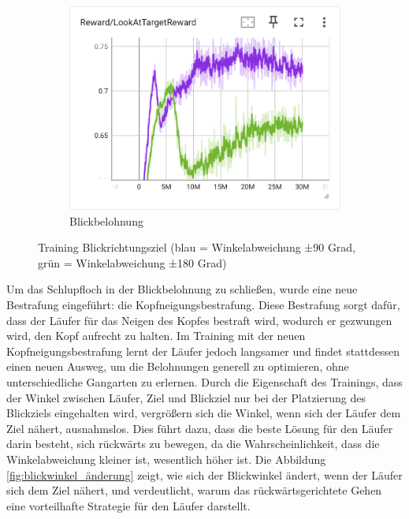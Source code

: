 \begin{figure}[H]
\begin{subfigure}{.49\textwidth}
      \centering  
      \includegraphics[width=\textwidth]{img/104_105_look_reward}
      \caption{Blickbelohnung}
      \label{fig:104_105_look_reward}
    \end{subfigure}
  \caption{Training Blickrichtungsziel (blau = Winkelabweichung ±90 Grad, grün = Winkelabweichung ±180 Grad)}
  \label{fig:training_blickrichtungsziel}
\end{figure}

Um das Schlupfloch in der Blickbelohnung zu schließen, wurde eine neue Bestrafung eingeführt: die Kopfneigungsbestrafung. Diese Bestrafung sorgt dafür, dass der Läufer für das Neigen des Kopfes bestraft wird, wodurch er gezwungen wird, den Kopf aufrecht zu halten. Im Training mit der neuen Kopfneigungsbestrafung lernt der Läufer jedoch langsamer und findet stattdessen einen neuen Ausweg, um die Belohnungen generell zu optimieren, ohne unterschiedliche Gangarten zu erlernen. Durch die Eigenschaft des Trainings, dass der Winkel zwischen Läufer, Ziel und Blickziel nur bei der Platzierung des Blickziels eingehalten wird, vergrößern sich die Winkel, wenn sich der Läufer dem Ziel nähert, ausnahmslos. Dies führt dazu, dass die beste Lösung für den Läufer darin besteht, sich rückwärts zu bewegen, da die Wahrscheinlichkeit, dass die Winkelabweichung kleiner ist, wesentlich höher ist. Die Abbildung \ref{fig:blickwinkel_änderung} zeigt, wie sich der Blickwinkel ändert, wenn der Läufer sich dem Ziel nähert, und verdeutlicht, warum das rückwärtsgerichtete Gehen eine vorteilhafte Strategie für den Läufer darstellt.

